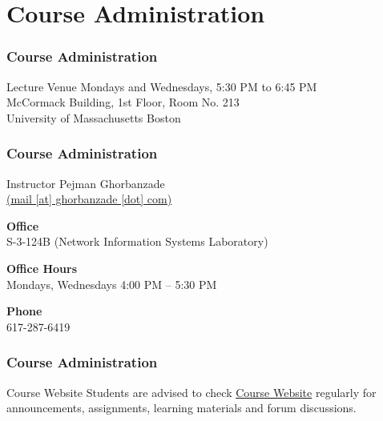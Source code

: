 \documentclass[10pt, compress]{beamer}
\begin{document}
\prepareCover

\section{Course Administration}

\begin{frame}[fragile]
	\frametitle{Course Administration}
	\begin{block}{Lecture Venue}
		Mondays and Wednesdays, 5:30 PM to 6:45 PM\\
		McCormack Building, 1st Floor, Room No. 213\\
		University of Massachusetts Boston
	\end{block}
\end{frame}

\begin{frame}[fragile]
	\frametitle{Course Administration}
	\begin{block}{Instructor}
		Pejman Ghorbanzade\\\href{mailto:mail@ghorbanzade.com}{(mail [at] ghorbanzade [dot] com)}

		\textbf{Office}\\S-3-124B (Network Information Systems Laboratory)

		\textbf{Office Hours}\\Mondays, Wednesdays 4:00 PM -- 5:30 PM

		\textbf{Phone}\\617-287-6419
	\end{block}
\end{frame}

%
%
%

\begin{frame}
	\frametitle{Course Administration}
	\begin{block}{Course Website}
		Students are advised to check \href{http://www.ghorbanzade.com/teaching/UMB-CS114-2015F}{\alert{Course Website}} regularly for announcements, assignments, learning materials and forum discussions.
	\end{block}
\end{frame}
\end{document}
